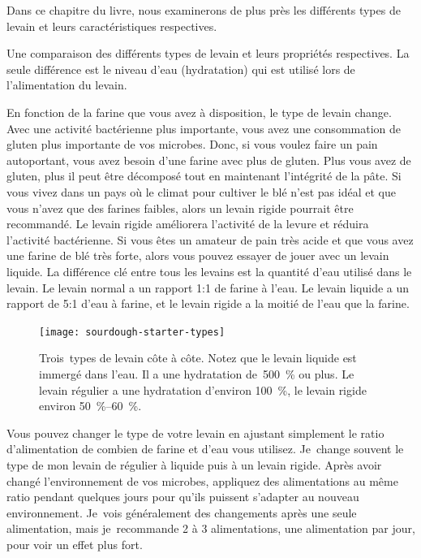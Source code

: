 \begin{quoting}
Dans ce chapitre du livre, nous examinerons de plus près
les différents types de levain et leurs caractéristiques respectives.
\end{quoting}

\begin{table}[htp!]
    \begin{center}
        
        \caption[Différents types de levain]{Une comparaison des différents
            types de levain et leurs propriétés respectives. La seule
            différence est le niveau d'eau (hydratation) qui est utilisé lors
            de l'alimentation du levain.}%
        \label{tab:starter-types-comparison}
    \end{center}
\end{table}

En fonction de la farine que vous avez à disposition, le type de levain change. Avec une activité bactérienne plus importante, vous avez une consommation de gluten plus importante de vos microbes. Donc, si
vous voulez faire un pain autoportant, vous avez besoin d'une farine avec plus de gluten. Plus vous avez de gluten, plus il peut être décomposé tout en maintenant
l'intégrité de la pâte. Si vous vivez dans un pays où le climat pour cultiver le blé
n'est pas idéal et que vous n'avez que des farines faibles, alors un levain rigide
pourrait être recommandé. Le levain rigide améliorera l'activité de la levure et
réduira l'activité bactérienne. Si vous êtes un amateur de pain très acide et que vous avez une
farine de blé très forte, alors vous pouvez essayer de jouer avec un levain liquide.
La différence clé entre tous les levains est la quantité d'eau
utilisé dans le levain. Le levain normal a un rapport 1:1 de farine
à l'eau. Le levain liquide a un rapport de 5:1 d'eau à farine, et le levain rigide
a la moitié de l'eau que la farine.

\begin{figure}[!htb]
  \texttt{[image: sourdough-starter-types]}
  \caption[Levain liquide, régulier et rigide]{Trois~types de levain
      côte à côte. Notez que le levain liquide est immergé dans l'eau.
      Il a une hydratation de~\qty{500}{\percent} ou plus.  Le levain régulier
      a une hydratation d'environ \qty{100}{\percent}, le levain rigide environ
      \qtyrange{50}{60}{\percent}.}%
  \label{fig:starter-types}
\end{figure}

Vous pouvez changer le type de votre levain en ajustant simplement le ratio d'alimentation de combien
de farine et d'eau vous utilisez. Je~change souvent le type de mon levain de
régulier à liquide puis à un levain rigide. Après avoir changé l'environnement de vos microbes, appliquez des alimentations au même ratio pendant quelques jours pour qu'ils puissent s'adapter au nouveau environnement. Je~vois généralement
des changements après une seule alimentation, mais je~recommande 2 à 3 alimentations, une alimentation par
jour, pour voir un effet plus fort.

